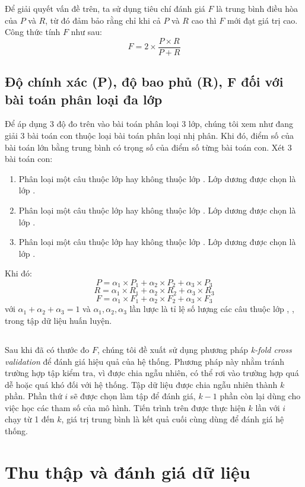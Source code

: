 Để giải quyết vấn đề trên, ta sử dụng tiêu chí đánh giá \(F\) là trung bình điều hòa của \(P\) và \(R\), từ đó đảm bảo rằng chỉ khi cả \(P\) và \(R\) cao thì \(F\) mới đạt giá trị cao. Công thức tính \(F\) như sau:
$$F=2 \times \frac{P \times R}{P + R} $$
\subsection*{Độ chính xác (P), độ bao phủ (R), F đối với bài toán phân loại đa lớp}
Để áp dụng 3 độ đo trên vào bài toán phân loại 3 lớp, chúng tôi xem như đang giải 3 bài toán con thuộc loại bài toán phân loại nhị phân. Khi đó, điểm số của bài toán lớn bằng trung bình có trọng số của điểm số từng bài toán con. Xét 3 bài toán con:
\begin{enumerate}
\item Phân loại một câu thuộc lớp \tichcuc hay không thuộc lớp \tichcuc. Lớp dương được chọn là lớp \tichcuc.
\item Phân loại một câu thuộc lớp \tieucuc hay không thuộc lớp \tieucuc. Lớp dương được chọn là lớp \tieucuc.
\item Phân loại một câu thuộc lớp \trungtinh hay không thuộc lớp \trungtinh. Lớp dương được chọn là lớp \trungtinh.
\end{enumerate}
Khi đó:
$$P = \alpha_1 \times P_1 + \alpha_2 \times P_2 + \alpha_3 \times P_3$$
$$R = \alpha_1 \times R_1 + \alpha_2 \times R_2 + \alpha_3 \times R_3$$
$$F = \alpha_1 \times F_1 + \alpha_2 \times F_2 + \alpha_3 \times F_3$$
với $\alpha_1 + \alpha_2 + \alpha_3 = 1$ và $\alpha_1, \alpha_2, \alpha_3$ lần lược là tỉ lệ số lượng các câu thuộc lớp \tichcuc, \tieucuc, \trungtinh trong tập dữ liệu huấn luyện.
\subsection*{}
Sau khi đã có thước đo \(F\), chúng tôi đề xuất sử dụng phương pháp \textit{k-fold cross validation} để đánh giá hiệu quả của hệ thống. Phương pháp này nhằm tránh trường hợp tập kiểm tra, vì được chia ngẫu nhiên, có thể rơi vào trường hợp quá dễ hoặc quá khó đối với hệ thống. Tập dữ liệu được chia ngẫu nhiên thành \(k\) phần. Phần thứ \(i\) sẽ được chọn làm tập để đánh giá, \(k-1\) phần còn lại dùng cho việc học các tham số của mô hình. Tiến trình trên được thực hiện \(k\) lần với \(i\) chạy từ 1 đến \(k\), giá trị trung bình là kết quả cuối cùng dùng để đánh giá hệ thống.

\section{Thu thập và đánh giá dữ liệu} \label{sec:thu-thap-va-danh-gia-du-lieu}
